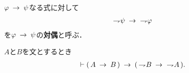 	$\varphi \rarrow \psi$なる式に対して
	\begin{align}
		\negation \psi \rarrow\ \negation \varphi
	\end{align}
	を$\varphi \rarrow \psi$の{\bf 対偶}と呼ぶ．
	
	\begin{screen}
		\begin{logicalthm}[対偶命題が導かれる]
		\label{logicalthm:introduction_of_contraposition}
			$A$と$B$を文とするとき
			\begin{align}
				\vdash (\, A \rarrow B\, ) 
				\rarrow (\, \negation B \rarrow\ \negation A\, ).
			\end{align}
		\end{logicalthm}
	\end{screen}
	
